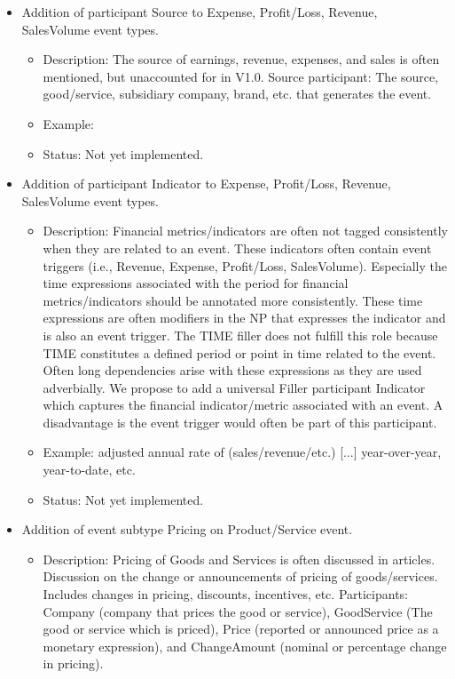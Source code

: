 \begin{itemize}[leftmargin=*]
    \item Addition of participant Source to Expense, Profit/Loss, Revenue, SalesVolume event types.
        \begin{itemize}
            \item Description: The source of earnings, revenue, expenses, and sales is often mentioned, but unaccounted for in V1.0. 
            Source participant: The source, good/service, subsidiary company, brand, etc. that generates the event.
            \item Example:
            \item Status: Not yet implemented.
        \end{itemize}
    \item Addition of participant Indicator to Expense, Profit/Loss, Revenue, SalesVolume event types.
        \begin{itemize}
            \item Description: Financial metrics/indicators are often not tagged consistently when they are related to an event. These indicators often contain event triggers (i.e., Revenue, Expense, Profit/Loss, SalesVolume). Especially the time expressions associated with the period for financial metrics/indicators should be annotated more consistently. These time expressions are often modifiers in the NP that expresses the indicator and is also an event trigger. The TIME filler does not fulfill this role because TIME constitutes a defined period or point in time related to the event. Often long dependencies arise with these expressions as they are used adverbially.
            We propose to add a universal Filler participant Indicator which captures the financial indicator/metric associated with an event. A disadvantage is the event trigger would often be part of this participant.
            \item Example: adjusted annual rate of (sales/revenue/etc.) [...] year-over-year, year-to-date, etc.
            \item Status: Not yet implemented.
        \end{itemize}
    \item Addition of event subtype Pricing on Product/Service event.
        \begin{itemize}
            \item Description: Pricing of Goods and Services is often discussed in articles. Discussion on the change or announcements of pricing of goods/services. Includes changes in pricing, discounts, incentives, etc. Participants: Company (company that prices the good or service), GoodService (The good or service which is priced), Price (reported or announced price as a monetary expression), and ChangeAmount (nominal or percentage change in pricing).

\end{itemize}
\end{itemize}
